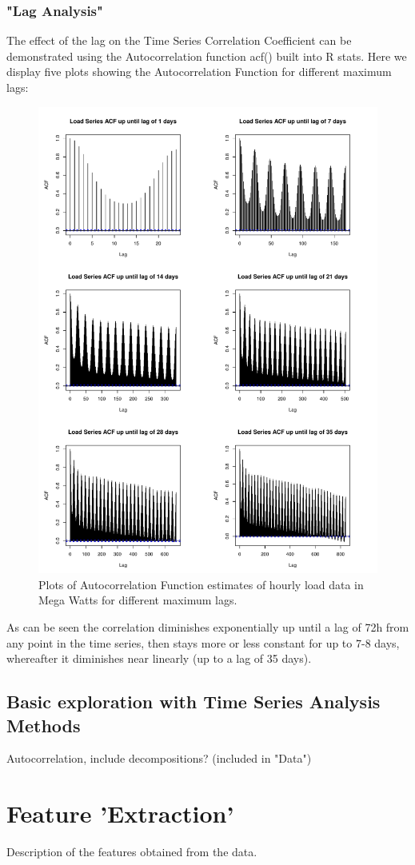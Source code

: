 \documentclass{article}
\begin{document}
\subsubsection{"Lag Analysis"}
The effect of the lag on the Time Series Correlation Coefficient can be demonstrated using the Autocorrelation function acf() built into R stats. Here we display five plots showing the Autocorrelation Function for different maximum lags: 
\begin{figure}[h!]
\centering
\includegraphics[width=.7\textwidth]{../data/analysis/acf-load-lag-var-days_font.pdf}
\caption{Plots of Autocorrelation Function estimates of hourly load data in Mega Watts for different maximum lags.}
\label{fig:load-acf}
\end{figure}

As can be seen the correlation diminishes exponentially up until a lag of 72h from any point in the time series, then stays more or less constant for up to 7-8 days, whereafter it diminishes near linearly (up to a lag of 35 days). 
\subsection{Basic exploration with Time Series Analysis Methods}
Autocorrelation, include decompositions? (included in "Data")

\section{Feature 'Extraction'}
Description of the features obtained from the data. 
\end{document}
